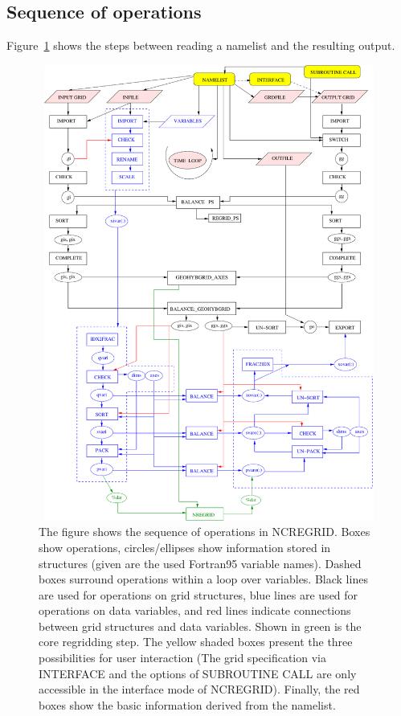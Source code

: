 \documentclass[12pt, a4paper]{article}
\begin{document}
\subsection{Sequence of operations}
\label{sec:opseq}
Figure~\ref{fig:control} shows the steps between reading a namelist
and the resulting output.
%
\begin{figure}
  \centerline{\includegraphics[width=14cm,height=15cm]{control}}
  \caption[NCREGRID Sequence of operations]
          {The figure shows the sequence of operations in NCREGRID. Boxes show
           operations, circles/ellipses show information stored
           in structures (given are the used Fortran95 variable names).
           Dashed boxes surround 
           operations within a loop over variables.
           Black lines are used for operations on grid
           structures, blue lines are used for operations on data variables,
           and red lines indicate connections between grid structures and
           data variables.
           Shown in green is the core regridding step.
           The yellow shaded boxes present the three possibilities
           for user interaction (The grid specification
           via INTERFACE and the options of SUBROUTINE CALL
           are only accessible in the interface mode of NCREGRID).
           Finally, the red boxes show the basic information
           derived from the namelist.
          }
  \label{fig:control}
\end{figure}
\end{document}
